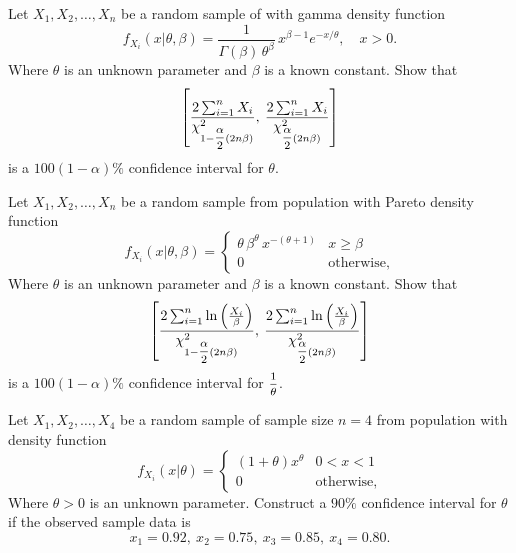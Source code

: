 \begin{mdframed}
    \begin{Exercise}
        Let $X_1, X_2, \ldots, X_n$ be a random sample of 
        with gamma density function
        \[
                f_{X_i}(x|\theta, \beta) = \frac{1}{\Gamma(\beta)\, \theta^\beta} \, x^{\beta - 1} e^{-x/\theta}, \quad x > 0.
        \]
        Where $\theta$ is an unknown parameter and $\beta$ is a known constant. Show that
        \[
            \left[ \frac{2 \sum^n_{i=1} X_i}{\chi^2_{1 - \mfrac{\alpha}{2} (2n\beta)}},\> \frac{2 \sum^n_{i=1} X_i}{\chi^2_{\mfrac{\alpha}{2} (2n\beta)}} \right]
        \]
        is a $100(1-\alpha)\%$ confidence interval for $\theta$.
    \end{Exercise}

    \begin{Exercise}
        Let $X_1, X_2, \ldots, X_n$ be a random sample from population 
        with Pareto density function
        \[
                f_{X_i}(x|\theta, \beta) = \begin{cases}
                    \theta \, \beta^\theta \, x^{-(\theta + 1)} & x \geq \beta\\
                    0 & \text{otherwise,}
                \end{cases}
        \]
        Where $\theta$ is an unknown parameter and $\beta$ is a known constant. Show that
        \[
            \left[ \frac{2 \sum^n_{i=1} \ln \left(\frac{X_i}{\beta}\right)}{\chi^2_{1 - \mfrac{\alpha}{2} (2n\beta)}},\> \frac{2 \sum^n_{i=1} \ln \left(\frac{X_i}{\beta}\right)}{\chi^2_{\mfrac{\alpha}{2} (2n\beta)}} \right]
        \]
        is a $100(1-\alpha)\%$ confidence interval for $\mfrac{1}{\theta}$.
    \end{Exercise}

    \begin{Exercise}
        Let $X_1, X_2, \ldots, X_4$ be a random sample of sample size $n=4$ from population 
        with density function
        \[
                f_{X_i}(x|\theta) = \begin{cases}
                    (1+\theta)x^\theta & 0 < x < 1\\
                    0 & \text{otherwise,}
                \end{cases}
        \]
        Where $\theta > 0$ is an unknown parameter. 
        Construct a $90\%$ confidence interval for $\theta$ if the observed sample data is
        \[
            x_1 = 0.92,\> x_2 = 0.75,\> x_3 = 0.85,\> x_4 = 0.80.
        \]
    \end{Exercise}
\end{mdframed}